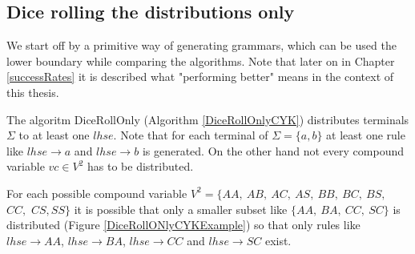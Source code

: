 \pagebreak

\subsection{Dice rolling the distributions only} \label{diceRollOnlyCYK}
\noindent We start off by a primitive way of generating grammars, which can be used the lower boundary while comparing the algorithms. Note that later on in Chapter \ref{successRates} it is described what "performing better" means in the context of this thesis. \\

\noindent
{}

\noindent The algoritm DiceRollOnly (Algorithm \ref{DiceRollOnlyCYK}) distributes terminals $\Sigma$ to at least one $lhse$. Note that for each terminal of $\Sigma=\{a,b\}$ at least one rule like $lhse\rightarrow a$ and $lhse\rightarrow b$ is generated. On the other hand not every compound variable $vc \in V^2$ has to be distributed.\\

\begin{testexample}
	For each possible compound variable $V^2=\{AA,~AB,~AC,~AS,~BB,~BC,~BS,~$ $CC,$ $CS,SS\}$ it is possible that only a smaller subset like $\{AA,~BA,~CC,~SC\}$ is distributed (Figure \ref{DiceRollONlyCYKExample}) so that only rules like $lhse\rightarrow AA$, $lhse\rightarrow BA$, $lhse\rightarrow CC$ and $lhse\rightarrow SC$ exist.\\
	
	\begin{minipage}{6in}
		\centering
	\end{minipage}
	\label{DiceRollONlyCYKExample}
\end{testexample}



